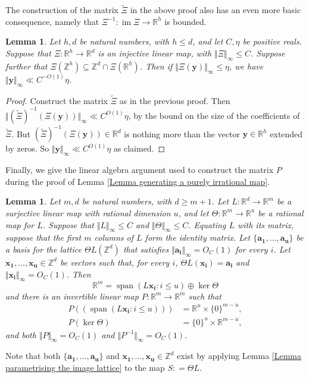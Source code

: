 \documentclass[12pt,a4paper,twoside,reqno]{amsart}
\newtheorem{Lemma}[Theorem]{Lemma}
\newcommand{\spn}{\operatorname{span}}
\newcommand{\im}{\operatorname{im}}
\numberwithin{equation}{section}
\begin{document}
The construction of the matrix $\widetilde{\Xi}$ in the above proof also has an even more basic consequence, namely that $\Xi^{-1}:\im \Xi \longrightarrow \mathbb{R}^h$ is bounded. 
\begin{Lemma}
\label{Lemma bounded inverse}
Let $h,d$ be natural numbers, with $h\leqslant d$, and let $C,\eta$ be positive reals. Suppose that $\Xi:\mathbb{R}^h \longrightarrow \mathbb{R}^d$ is an injective linear map, with $\Vert \Xi\Vert_\infty \leqslant C$. Suppose further that $\Xi(\mathbb{Z}^h) \subseteq \mathbb{Z}^d \cap \Xi(\mathbb{R}^h)$. Then if $\Vert \Xi(\mathbf{y})\Vert_\infty \leqslant \eta$, we have $\Vert \mathbf{y} \Vert_\infty \ll C^{-O(1)} \eta$. 
\end{Lemma}
\begin{proof}
Construct the matrix $\widetilde{\Xi}$ as in the previous proof. Then $\Vert(\widetilde{\Xi})^{-1} (\Xi(\mathbf{y}))\Vert_\infty \ll C^{O(1)} \eta$, by the bound on the size of the coefficients of $\widetilde{\Xi}$. But $(\widetilde{\Xi})^{-1} (\Xi(\mathbf{y})) \in\mathbb{R}^{d}$ is nothing more than the vector $\mathbf{y} \in\mathbb{R}^h$ extended by zeros. So $\Vert \mathbf{y} \Vert_\infty \ll C^{O(1)} \eta$ as claimed. 
\end{proof}

Finally, we give the linear algebra argument used to construct the matrix $P$ during the proof of Lemma \ref{Lemma generating a purely irrational map}. 
\begin{Lemma}
\label{Lemma construction of P}
Let $m,d$ be natural numbers, with $d\geqslant m+1$. Let $L:\mathbb{R}^{d} \longrightarrow \mathbb{R}^m$ be a surjective linear map with rational dimension $u$, and let $\Theta:\mathbb{R}^{m} \longrightarrow \mathbb{R}^u$ be a rational map for $L$. Suppose that $\Vert L\Vert_\infty \leqslant C$ and $\Vert \Theta \Vert_\infty \leqslant C$. Equating $L$ with its matrix, suppose that the first $m$ columns of $L$ form the identity matrix. Let $\{\mathbf{a_1},\dots,\mathbf{a_u}\}$ be a basis for the lattice $\Theta L(\mathbb{Z}^d)$ that satisfies $\Vert \mathbf{a_i}\Vert_\infty = O_{C}(1)$ for every $i$. Let $\mathbf{x_1},\dots,\mathbf{x_u}\in\mathbb{Z}^d$ be vectors such that, for every $i$, $\Theta L(\mathbf{x_i}) = \mathbf{a_i}$ and $\Vert \mathbf{x_i}\Vert_\infty = O_{C}(1)$. Then \begin{equation}
\label{direct sum chapter 3}
\mathbb{R}^m = \spn(L\mathbf{x_i}:i\leqslant u) \oplus \ker \Theta
\end{equation} and there is an invertible linear map $P:\mathbb{R}^m \longrightarrow \mathbb{R}^m$ such that
\begin{align}
P((\spn(L\mathbf{x_i}:i\leqslant u))) &= \mathbb{R}^u \times \{0\}^{m-u},\nonumber \\
P(\ker \Theta) &= \{0\}^{u} \times \mathbb{R}^{m-u}, \nonumber
\end{align}
\noindent and both $\Vert P\Vert_\infty = O_{C}(1)$ and $\Vert P^{-1} \Vert_\infty = O_{C}(1)$. 
\end{Lemma}
\noindent Note that both $\{\mathbf{a_1},\dots,\mathbf{a_u}\}$ and $\mathbf{x_1},\dots,\mathbf{x_u}\in\mathbb{Z}^d$ exist by applying Lemma \ref{Lemma parametrising the image lattice} to the map $S: = \Theta L$.
\end{document}
